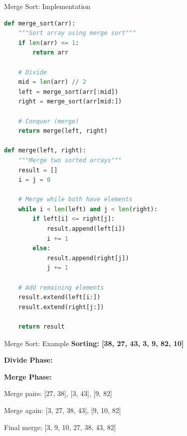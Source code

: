 \documentclass[aspectratio=169]{beamer}
\begin{document}
\begin{frame}[fragile]{Merge Sort: Implementation}
\begin{lstlisting}[language=Python, basicstyle=\ttfamily\tiny]
def merge_sort(arr):
    """Sort array using merge sort"""
    if len(arr) <= 1:
        return arr

    # Divide
    mid = len(arr) // 2
    left = merge_sort(arr[:mid])
    right = merge_sort(arr[mid:])

    # Conquer (merge)
    return merge(left, right)

def merge(left, right):
    """Merge two sorted arrays"""
    result = []
    i = j = 0

    # Merge while both have elements
    while i < len(left) and j < len(right):
        if left[i] <= right[j]:
            result.append(left[i])
            i += 1
        else:
            result.append(right[j])
            j += 1

    # Add remaining elements
    result.extend(left[i:])
    result.extend(right[j:])

    return result
\end{lstlisting}
\end{frame}

\begin{frame}{Merge Sort: Example}
  \textbf{Sorting: [38, 27, 43, 3, 9, 82, 10]}

  \vspace{0.3cm}
  \textbf{Divide Phase:}
  \begin{center}
  \end{center}

  \vspace{0.3cm}
  \textbf{Merge Phase:}
  \begin{center}
  Merge pairs: [27, 38], [3, 43], [9, 82]

  Merge again: [3, 27, 38, 43], [9, 10, 82]

  Final merge: [3, 9, 10, 27, 38, 43, 82]
  \end{center}
\end{frame}
\end{document}

